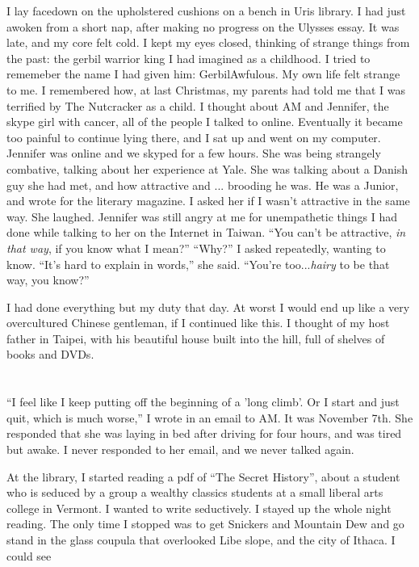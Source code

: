I lay facedown on the upholstered cushions on a bench in Uris library.  I had
just awoken from a short nap, after making no progress on the Ulysses essay.  It
was late, and my core felt cold.  I kept my eyes closed, thinking of strange
things from the past: the gerbil warrior king I had imagined as a childhood.  I
tried to rememeber the name I had given him: GerbilAwfulous.  My own life felt
strange to me.  I remembered how, at last Christmas, my parents had told me that
I was terrified by The Nutcracker as a child.  I thought about AM and Jennifer,
the skype girl with cancer, all of the people I talked to online.  Eventually it
became too painful to continue lying there, and I sat up and went on my
computer.  Jennifer was online and we skyped for a few hours.  She was being
strangely combative, talking about her experience at Yale.  She was talking
about a Danish guy she had met, and how attractive and ... brooding he was.  He
was a Junior, and wrote for the literary magazine.  I asked her if I wasn't
attractive in the same way.  She laughed.  Jennifer was still angry at me for
unempathetic things I had done while talking to her on the Internet in Taiwan.
``You can't be attractive, \textit{in that way}, if you know what I mean?''
``Why?'' I asked repeatedly, wanting to know. ``It's hard to explain in words,''
she said.  ``You're too...\textit{hairy} to be that way, you know?''

I had done everything but my duty that day.  At worst I would end up like a very
overcultured Chinese gentleman, if I continued like this.  I thought of my host
father in Taipei, with his beautiful house built into the hill, full of shelves
of books and DVDs.  

\section{}

``I feel like I keep putting off the beginning of a 'long climb'.  Or I start
and just quit, which is much worse,'' I wrote in an email to AM.  It was
November 7th. She responded that she was laying in bed after driving for four
hours, and was tired but awake.  I never responded to her email, and we never
talked again.

At the library, I started reading a pdf of ``The Secret History'', about a
student who is seduced by a group a wealthy classics students at a small liberal
arts college in Vermont.  I wanted to write seductively.  I stayed up the whole
night reading.  The only time I stopped was to get Snickers and Mountain Dew and
go stand in the glass coupula that overlooked Libe slope, and the city of
Ithaca.  I could see

